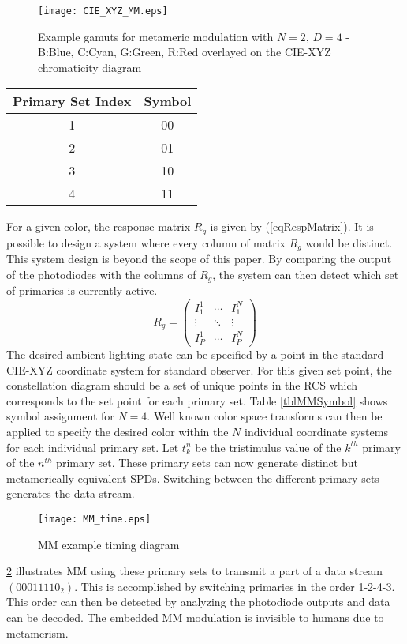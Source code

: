 \begin{figure}
	\centering
    \texttt{[image: CIE\_XYZ\_MM.eps]}
	\caption{Example gamuts for metameric modulation with $N=2$, $D=4$ - B:Blue, C:Cyan, G:Green, R:Red overlayed on the CIE-XYZ chromaticity diagram}
	\label{figCIEXYZMM}
\end{figure}

\begin{table*}[b]
	\centering
		\begin{tabular}{|c|c|}
		\hline
		{Primary Set Index} & {Symbol}\\
		\hline
		1 & 00\\
		2 & 01\\
		3 & 10\\
		4 & 11\\
		\hline
		\end{tabular}
	\caption{Metameric Channel Symbol Assignment}
	\label{tblMMSymbol}
\end{table*}

For a given color, the response matrix $R_{g}$ is given by (\ref{eqRespMatrix}). It is possible to design a system where every column of matrix $R_{g}$ would be distinct. This system design is beyond the scope of this paper. By comparing the output of the photodiodes with the columns of $R_{g}$, the system can then detect which set of primaries is currently active.
\begin{equation}
	\label{eqRespMatrix}
R_{g} = \left( \begin{array}{ccc}
I_{1}^{1}&\cdots&I_{1}^{N}\\
\vdots&\ddots&\vdots\\
I_{P}^{1}&\cdots&I_{P}^{N}
\end{array} \right)
\end{equation}
The desired ambient lighting state can be specified by a point in the standard CIE-XYZ coordinate system for standard observer. For this given set point, the constellation diagram should be a set of unique points in the RCS which corresponds to the set point for each primary set. Table \ref{tblMMSymbol} shows symbol assignment for $N=4$. Well known color space transforms can then be applied to specify the desired color within the $N$ individual coordinate systems for each individual primary set. Let $t_{k}^{n}$ be the tristimulus value of the $k^{th}$ primary of the $n^{th}$ primary set. These primary sets can now generate distinct but metamerically equivalent SPDs. Switching between the different primary sets generates the data stream.

\begin{figure}[t]
	\centering
    \texttt{[image: MM\_time.eps]}
	\caption{MM example timing diagram}
	\label{figMMex}
\end{figure}

\figurename{ \ref{figMMex}} illustrates MM using these primary sets to transmit a part of a data stream $(00011110_{2})$. This is accomplished by switching primaries in the order 1-2-4-3. This order can then be detected by analyzing the photodiode outputs and data can be decoded. The embedded MM modulation is invisible to humans due to metamerism.


